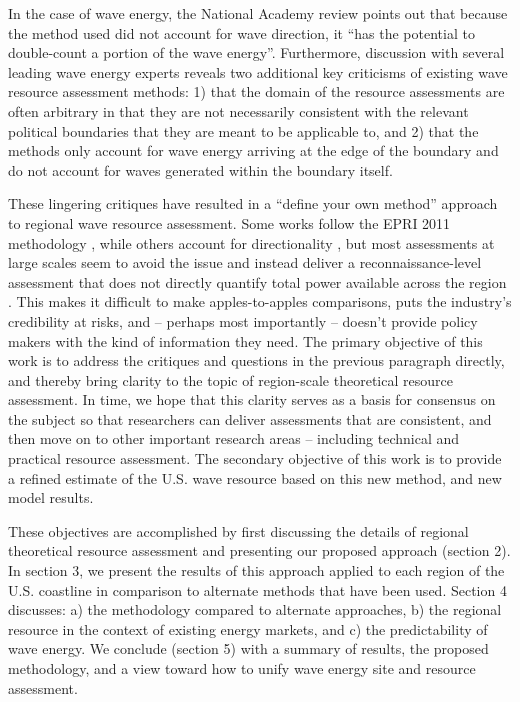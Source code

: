 In the case of wave energy, the National Academy review points out that
because the method used did not account for wave direction, it ``has the
potential to double-count a portion of the wave energy''. Furthermore, discussion with several leading wave energy experts reveals two additional key criticisms of existing wave resource assessment methods: 1) that the domain of the resource assessments are often arbitrary in that they are not necessarily consistent with the relevant political boundaries that they are meant to be applicable to, and 2) that the methods only account for wave energy arriving at the edge of the boundary and do not account for waves generated within the boundary itself.

These lingering critiques have resulted in a ``define your own method'' approach to regional wave resource assessment. Some works follow the EPRI 2011 methodology \citep[e.g., ]{kumarWaveEnergyResource2015}, while others account for directionality \citep[e.g., ]{gunnQuantifyingGlobalWave2012, regueroGlobalWavePower2015, hemerRevisedAssessmentAustralia2017}, but most assessments at large scales seem to avoid the issue and instead deliver a reconnaissance-level assessment that does not directly quantify total power available across the region \citep[e.g.,]{robertsonCharacterizingShoreWave2014, sierraWaveEnergyResource2013, zhengAssessingChinaSea2013, neillWavePowerVariability2013, alonsoWaveEnergyResource2015}.
This makes it difficult to make apples-to-apples comparisons, puts the industry's credibility at risks, and -- perhaps most importantly -- doesn't provide policy makers with the kind of information they need. The primary objective of this work is to address the critiques and questions in the previous paragraph directly, and thereby bring clarity to the topic of region-scale theoretical resource assessment. In time, we hope that this clarity serves as a basis for consensus on the subject so that researchers can deliver assessments that are consistent, and then move on to other important research areas -- including technical and practical resource assessment. The secondary objective of this work is to provide a refined estimate of
the U.S. wave resource based on this new method, and new model
results. 

These objectives are accomplished by first discussing the details of regional theoretical resource assessment and presenting our proposed approach (section 2). In section 3, we present the results of this approach applied to each region of the U.S. coastline in comparison to alternate methods that have been used. Section 4 discusses: a) the methodology compared to alternate approaches, b) the regional resource in the context of existing energy markets, and c) the predictability of wave energy. We conclude (section 5) with a summary of results, the proposed methodology, and a view toward how to unify wave energy site and resource assessment.


